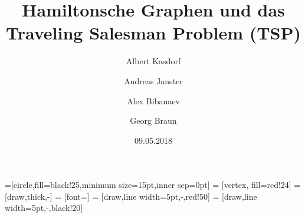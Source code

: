 \documentclass{article}
\title{Hamiltonsche Graphen und das\\ Traveling Salesman Problem (TSP)}
\author{
  Albert Kasdorf\and
  Andreas Janster\and
  Alex Bibanaev\and
  Georg Braun}
\date{09.05.2018}
\newtheorem{mydef}{Definition}
\begin{document}
=[circle,fill=black!25,minimum size=15pt,inner sep=0pt]
 = [vertex, fill=red!24]
 = [draw,thick,-]
 = [font=\small]
 = [draw,line width=5pt,-,red!50]
 = [draw,line width=5pt,-,black!20]

\maketitle


%
%
%
%
%
%
%
%
%
%
%
%
%
\end{document}

